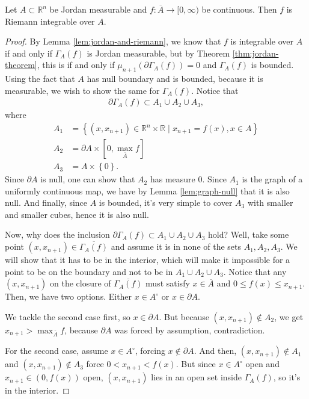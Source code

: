 \begin{lemma}\label{lem:unif-cont-func-int}
	Let $A \subset \mathbb{R}^{n}$ be Jordan measurable and $f: \overline{ A }  \to [0,\infty)$ be continuous. Then $f$ is Riemann integrable over $A$.
\end{lemma}
\begin{proof}
	By Lemma \ref{lem:jordan-and-riemann}, we know that $f$ is integrable over $A$ if and only if $\Gamma_{A}(f)$ is Jordan measurable, but by Theorem \ref{thm:jordan-theorem}, this is if and only if $\mu_{n+1}(\partial \Gamma_{A}(f)) = 0$ and $\Gamma_{A}(f)$ is bounded. Using the fact that $A$ has null boundary and is bounded, because it is measurable, we wish to show the same for $\Gamma_{A}(f)$. Notice that
	\begin{align*}
		\partial \Gamma_{A}(f) \subset A_{1} \cup A_{2} \cup  A_{3},
	\end{align*}
	where
	\begin{align*}
		A_{1} & = \left\{ (x, x_{n+1}) \in \mathbb{R}^{n} \times \mathbb{R} \mid x_{n+1} = f(x), x \in A \right\} \\
		A_{2} & = \partial A \times [0, \textstyle\max_{\overline{ A } } f]                                       \\
		A_{3} & = A \times \left\{ 0 \right\}.
	\end{align*}
	Since $\partial A$ is null, one can show that $A_{2}$ has measure $0$. Since $A_{1}$ is the graph of a uniformly continuous map, we have by Lemma \ref{lem:graph-null} that it is also null. And finally, since $A$ is bounded, it's very simple to cover $A_{3}$ with smaller and smaller cubes, hence it is also null.

	Now, why does the inclusion $\partial \Gamma_{A}(f) \subset A_{1} \cup A_{2} \cup A_{3}$ hold? Well, take some point $(x,x_{n+1}) \in \overline{ \Gamma_{A}(f) }$ and assume it is in none of the sets $A_{1}, A_{2}, A_{3}$. We will show that it has to be in the interior, which will make it impossible for a point to be on the boundary and not to be in $A_{1} \cup A_{2} \cup A_{3}$. Notice that any $(x,x_{n+1})$ on the closure of $\overline{ \Gamma_{A}(f) } $ must satisfy $x \in \overline{ A } $ and $0 \leq f(x) \leq x_{n+1}$. Then, we have two options. Either $x \in A^{\circ }$ or $x \in \partial A$.

	We tackle the second case first, so $x \in \partial A$. But because $(x, x_{n+1}) \not \in A_{2}$, we get $x_{n+1} > \max_{\overline{ A } } f$, because $\partial A$ was forced by assumption, contradiction.

	For the second case, assume $x \in A^{\circ }$, forcing $x \not \in \partial A$. And then, $(x, x_{n+1}) \not  \in A_{1}$ and $(x, x_{n+1}) \not \in A_{3}$ force $0 < x_{n+1} < f(x)$. But since $x \in A^{\circ }$ open and $x_{n+1} \in (0, f(x))$ open, $(x,x_{n+1})$ lies in an open set inside $\Gamma_{A}(f)$, so it's in the interior.
\end{proof}

